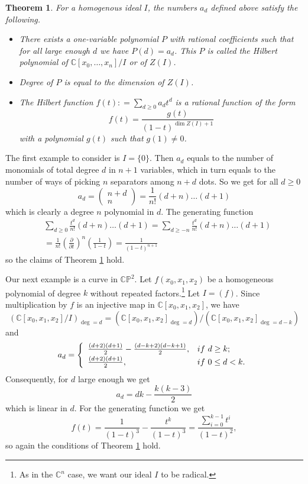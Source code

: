 \documentclass[11pt]{article}
\numberwithin{equation}{section}
\numberwithin{footnote}{section}
\newtheorem{thm}{Theorem}[section]
\newcommand{\blue}{\color{blue}}
\renewcommand{\P}{{\mathbb P}}
\newcommand{\C}{{\mathbb C}}
\begin{document}
\smallskip
\begin{thm}\label{Hilbertpoly}
For a homogenous ideal $I$, the numbers $a_d$ defined above satisfy the following.
\begin{itemize}
\item There exists a one-variable polynomial $P$ with rational coefficients such that for all large enough $d$ we have $P(d)=a_d$. This $P$ is called the {\blue Hilbert polynomial} of $\C[x_0,\ldots,x_n]/I$ or of $Z(I)$.

\item Degree of $P$ is equal to the dimension of $Z(I)$.

\item The {\blue Hilbert function}
$
f(t): = \sum_{d\geq 0} a_d t^d
$
is a rational function of the form 
$$
f(t) = \frac {g(t)}{(1-t)^{\dim Z(I) + 1}}
$$
with a polynomial $g(t)$ such that $g(1)\neq 0$.
\end{itemize}
\end{thm}

\smallskip
The first example to consider is $I=\{ 0\}$. Then $a_d$ equals to the number of monomials of total degree $d$ in $n+1$ variables, which in turn equals to the number of ways of picking $n$ separators among $n+d$ dots. So we get for all $d\geq 0$
$$
a_d = \left(\begin{array}{c}n+d\\n\end{array}\right) = \frac 1{n!} (d+n)\ldots (d+1)
$$
which is clearly a degree $n$ polynomial in $d$. The generating function
\begin{align*}
&\sum_{d\geq 0}  \frac {t^d}{n!} (d+n)\ldots (d+1) =
\sum_{d\geq -n}  \frac {t^d}{n!} (d+n)\ldots (d+1) \\&
= \frac 1{n!} \left( \frac {\partial}{\partial t}\right)^n\left(\frac 1{1-t}\right)
=\frac 1{(1-t)^{n+1}}
\end{align*}
so the claims of Theorem \ref{Hilbertpoly} hold. 

\smallskip
Our next example is a curve in $\C\P^2$. Let $f(x_0,x_1,x_2)$ be a homogeneous polynomial of degree $k$ without repeated factors.\footnote{ As in the $\C^n$ case, we want our ideal $I$ to be radical.} Let $I=(f)$. Since multiplication by $f$ is an injective map 
in $\C[x_0,x_1,x_2]$, we have 
$$
(\C[x_0,x_1,x_2]/I)_{\deg = d} = (\C[x_0,x_1,x_2]_{\deg = d})/ (\C[x_0,x_1,x_2]_{\deg = d-k})
$$
and 
$$
a_d = \left\{ \begin{array}{ll}
\frac {(d+2)(d+1)}2 -  \frac {(d-k+2)(d-k+1)}2,&{\rm if~} d\geq k;\\[.2em]
\frac {(d+2)(d+1)}2,&{\rm if~} 0\leq d< k.
\end{array}
\right.
$$
Consequently, for $d$ large enough we get 
$$
a_d = dk  - \frac {k(k-3)}2
$$
which is linear in $d$.
For the generating function we get 
$$f(t) = \frac 1{(1-t)^3} - \frac {t^k}{(1-t)^3} = 
\frac {\sum_{i=0}^{k-1}t^i}{(1-t)^2},
$$
so again the conditions of Theorem \ref{Hilbertpoly} hold.
\end{document}
